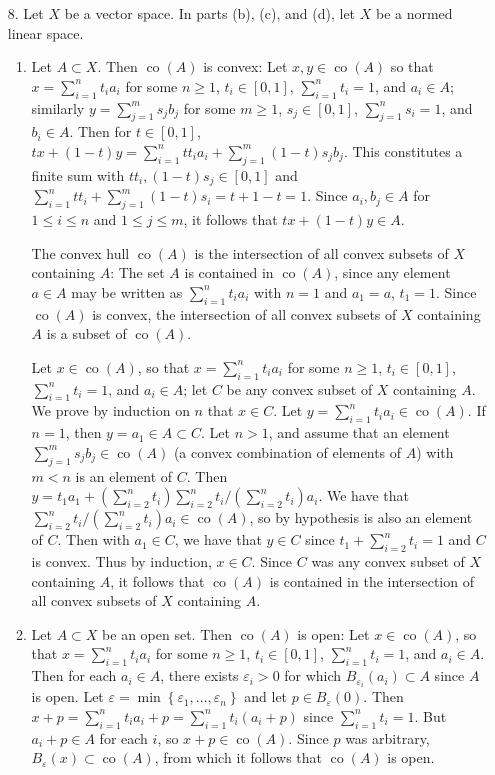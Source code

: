 \documentclass[11pt,leqno]{article}
\theoremstyle{plain}
\theoremstyle{definition}
\numberwithin{equation}{section}
\numberwithin{lem}{section}
\newcommand{\cbr}[1]{\left\{#1\right\}}
\DeclareMathOperator{\co}{co}
\begin{document}
\begin{enumerate}
  \item[8.] Let $X$ be a vector space. In parts (b), (c), and (d), let $X$ be a normed linear space.
  \begin{enumerate}
    \item Let $A\subset X$. Then $\co(A)$ is convex: Let $x,y\in \co(A)$ so that $x = \sum_{i=1}^n t_ia_i$ for some $n\geq 1$, $t_i\in [0,1]$, $\sum_{i=1}^n t_i = 1$, and $a_i\in A$; similarly $y = \sum_{j=1}^m s_jb_j$ for some $m\geq 1$, $s_j\in [0,1]$, $\sum_{j=1}^n s_i = 1$, and $b_i\in A$. Then for $t\in [0,1]$, $tx + (1-t)y = \sum_{i=1}^n tt_ia_i + \sum_{j=1}^m (1-t)s_jb_j$. This constitutes a finite sum with $tt_i,(1-t)s_j\in [0,1]$ and $\sum_{i=1}^n tt_i + \sum_{j=1}^m (1-t)s_i = t + 1-t =1$. Since $a_i,b_j\in A$ for $1\leq i\leq n$ and $1\leq j\leq m$, it follows that $tx + (1-t)y\in A$.
    
    The convex hull $\co(A)$ is the intersection of all convex subsets of $X$ containing $A$: The set $A$ is contained in $\co(A)$, since any element $a\in A$ may be written as $\sum_{i=1}^n t_ia_i$ with $n = 1$ and $a_1 = a$, $t_1 = 1$. Since $\co(A)$ is convex, the intersection of all convex subsets of $X$ containing $A$ is a subset of $\co(A)$.
    
    Let $x\in \co(A)$, so that $x = \sum_{i=1}^n t_ia_i$ for some $n\geq 1$, $t_i\in [0,1]$, $\sum_{i=1}^n t_i = 1$, and $a_i\in A$; let $C$ be any convex subset of $X$ containing $A$. We prove by induction on $n$ that $x\in C$. Let $y = \sum_{i=1}^n t_ia_i \in \co(A)$. If $n = 1$, then $y = a_1\in A\subset C$. Let $n>1$, and assume that an element $\sum_{j=1}^ms_jb_j\in \co(A)$ (a convex combination of elements of $A$) with $m<n$ is an element of $C$. Then $y = t_1a_1 + (\sum_{i=2}^n t_i)\sum_{i=2}^{n}t_i/(\sum_{i=2}^n t_i)a_i$. We have that $\sum_{i=2}^{n}t_i/(\sum_{i=2}^n t_i)a_i\in \co(A)$, so by hypothesis is also an element of $C$. Then with $a_1\in C$, we have that $y\in C$ since $t_1 + \sum_{i=2}^n t_i = 1$ and $C$ is convex. Thus by induction, $x\in C$. Since $C$ was any convex subset of $X$ containing $A$, it follows that $\co(A)$ is contained in the intersection of all convex subsets of $X$ containing $A$.

    \item Let $A\subset X$ be an open set. Then $\co(A)$ is open: Let $x\in \co(A)$, so that $x = \sum_{i=1}^n t_ia_i$ for some $n\geq 1$, $t_i\in [0,1]$, $\sum_{i=1}^n t_i = 1$, and $a_i\in A$. Then for each $a_i\in A$, there exists $\varepsilon_i>0$ for which $B_{\varepsilon_i}(a_i)\subset A$ since $A$ is open. Let $\varepsilon = \min\cbr{\varepsilon_1,\dots,\varepsilon_n}$ and let $p\in B_\varepsilon(0)$. Then $x+p = \sum_{i=1}^n t_ia_i + p = \sum_{i=1}^n t_i(a_i + p)$ since $\sum_{i=1}^n t_i = 1$. But $a_i+ p\in A$ for each $i$, so $x+p\in \co(A)$. Since $p$ was arbitrary, $B_\varepsilon(x)\subset \co(A)$, from which it follows that $\co(A)$ is open.
    

\end{enumerate}
\end{enumerate}
\end{document}
